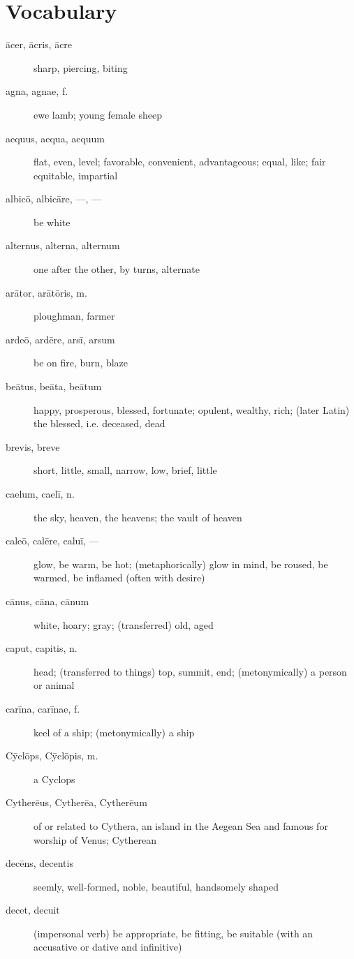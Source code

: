 \chapter*{Vocabulary}

\begin{description}
    \item[ācer, ācris, ācre] sharp, piercing, biting
    \item[agna, agnae, f.] ewe lamb; young female sheep
    \item[aequus, aequa, aequum] flat, even, level; favorable, convenient, advantageous; equal, like; fair equitable, impartial
    \item[albicō, albicāre, ---, ---] be white
    \item[alternus, alterna, alternum] one after the other, by turns, alternate
    \item[arātor, arātōris, m.] ploughman, farmer
    \item[ardeō, ardēre, arsī, arsum] be on fire, burn, blaze
    \item[beātus, beāta, beātum] happy, prosperous, blessed, fortunate; opulent, wealthy, rich; (later Latin) the blessed, i.e. deceased, dead
    \item[brevis, breve] short, little, small, narrow, low, brief, little
    \item[caelum, caelī, n.] the sky, heaven, the heavens; the vault of heaven
    \item[caleō, calēre, caluī, ---] glow, be warm, be hot; (metaphorically) glow in mind, be roused, be warmed, be inflamed (often with desire)
    \item[cānus, cāna, cānum] white, hoary; gray; (transferred) old, aged
    \item[caput, capitis, n.] head; (transferred to things) top, summit, end; (metonymically) a person or animal
    \item[carīna, carīnae, f.] keel of a ship; (metonymically) a ship 
    \item[Cȳclōps, Cȳclōpis, m.] a Cyclops
    \item[Cytherēus, Cytherēa, Cytherēum] of or related to Cythera, an island in the Aegean Sea and famous for worship of Venus; Cytherean
    \item[decēns, decentis] seemly, well-formed, noble, beautiful, handsomely shaped
    \item[decet, decuit] (impersonal verb) be appropriate, be fitting, be
        suitable (with an accusative or dative and infinitive)

\end{description}
